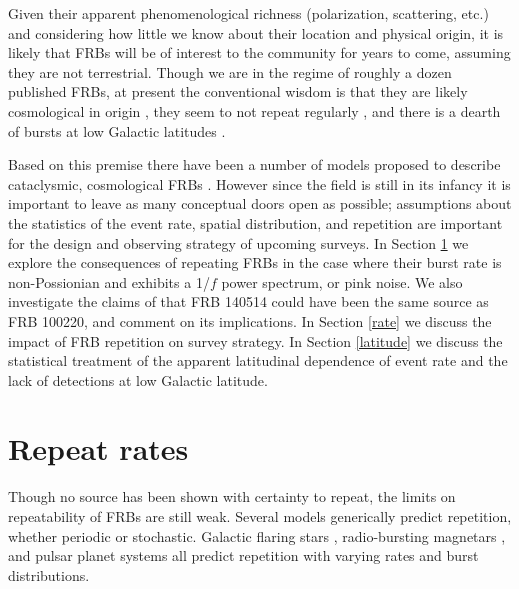 \documentclass[useAMS,usenatbib]{mn2e}
\begin{document}
Given their apparent phenomenological richness
(polarization, scattering, etc.) and considering
how little we know about their location and physical 
origin, it is likely that FRBs will be of interest to the community for 
years to come, assuming they are not terrestrial.
Though we are in the regime of roughly a dozen published FRBs, 
at present the conventional wisdom is that they are likely cosmological
in origin \citep{2013Sci...341...53T}, they seem to not repeat regularly
\citep{2015MNRAS.454..457P}, and there is a dearth of bursts 
at low Galactic latitudes \citep{2014ApJ...789L..26P, 2014ApJ...792...19B, 2015MNRAS.451.3278M}.

Based on this premise there have been 
a number of models proposed to describe cataclysmic, cosmological 
FRBs \citep{2012ApJ...760...64M, 2013PASJ...65L..12T, 2014A&A...562A.137F, 2015ApJ...814L..20M}.
However since the field is still in its infancy it is important to
leave as many conceptual doors open as possible;
assumptions about the statistics of the event rate, 
spatial distribution, and repetition are important for the design
and observing strategy of upcoming surveys. In Section \ref{repeat} we explore the 
consequences of repeating FRBs in the case where their 
burst rate is non-Possionian and exhibits a 1/$f$ power spectrum, 
or pink noise. We also investigate the claims of \cite{2015arXiv150701002M}
that FRB 140514 could have been the same source as FRB 100220, 
and comment on its implications. In Section \ref{rate} we
discuss the impact of FRB repetition on survey strategy. In Section \ref{latitude}
we discuss the statistical treatment of the apparent latitudinal dependence 
of event rate and the lack of detections at low Galactic latitude.


\section{Repeat rates}
\label{repeat}

Though no source has been shown with certainty to repeat, 
the limits on repeatability of FRBs are still weak. Several 
models generically predict repetition, whether periodic or stochastic. 
Galactic flaring stars \citep{2015arXiv150701002M}, radio-bursting 
magnetars \citep{2007arXiv0710.2006P, 2015ApJ...807..179P}, and pulsar planet systems 
\citep{2014A&A...569A..86M} all predict repetition with varying 
rates and burst distributions. 
\end{document}

